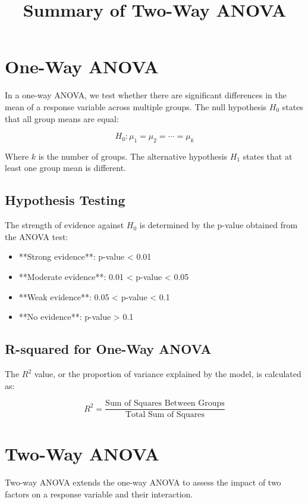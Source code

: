\documentclass{article}
\begin{document}
\title{Summary of Two-Way ANOVA}
\author{}
\date{}
\maketitle

\section{One-Way ANOVA}

In a one-way ANOVA, we test whether there are significant differences in the mean of a response variable across multiple groups. The null hypothesis \( H_0 \) states that all group means are equal:

\[
H_0: \mu_1 = \mu_2 = \cdots = \mu_k
\]

Where \( k \) is the number of groups. The alternative hypothesis \( H_1 \) states that at least one group mean is different.

\subsection{Hypothesis Testing}

The strength of evidence against \( H_0 \) is determined by the p-value obtained from the ANOVA test:
\begin{itemize}
    \item **Strong evidence**: p-value < 0.01
    \item **Moderate evidence**: 0.01 < p-value < 0.05
    \item **Weak evidence**: 0.05 < p-value < 0.1
    \item **No evidence**: p-value > 0.1
\end{itemize}

\subsection{R-squared for One-Way ANOVA}

The \( R^2 \) value, or the proportion of variance explained by the model, is calculated as:

\[
R^2 = \frac{\text{Sum of Squares Between Groups}}{\text{Total Sum of Squares}}
\]

\section{Two-Way ANOVA}

Two-way ANOVA extends the one-way ANOVA to assess the impact of two factors on a response variable and their interaction.
\end{document}
